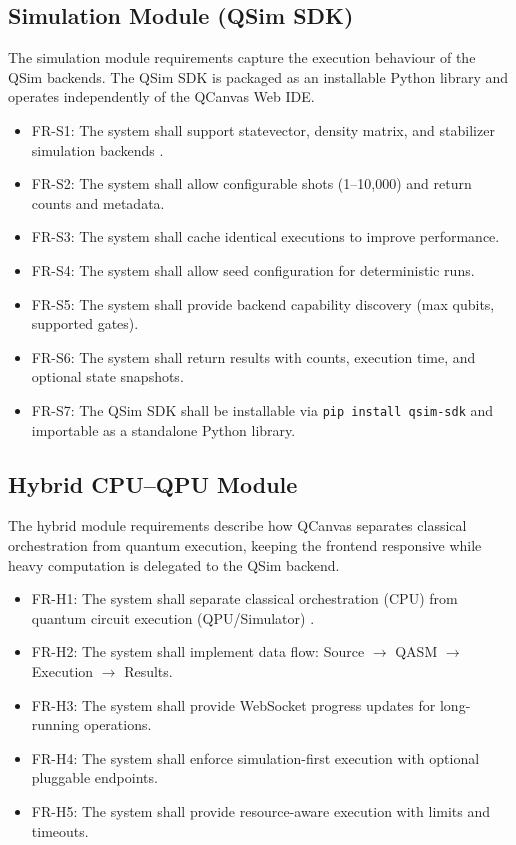 \subsection{Simulation Module (QSim SDK)}
The simulation module requirements capture the execution behaviour of the QSim backends. The QSim SDK is packaged as an installable Python library and operates independently of the QCanvas Web IDE.
\begin{itemize}
    \item FR-S1: The system shall support statevector, density matrix, and stabilizer simulation backends \cite{nielsen2010quantum}.
    \item FR-S2: The system shall allow configurable shots (1--10,000) and return counts and metadata.
    \item FR-S3: The system shall cache identical executions to improve performance.
    \item FR-S4: The system shall allow seed configuration for deterministic runs.
    \item FR-S5: The system shall provide backend capability discovery (max qubits, supported gates).
    \item FR-S6: The system shall return results with counts, execution time, and optional state snapshots.
    \item FR-S7: The QSim SDK shall be installable via \texttt{pip install qsim-sdk} and importable as a standalone Python library.
\end{itemize}

\subsection{Hybrid CPU--QPU Module}
The hybrid module requirements describe how QCanvas separates classical orchestration from quantum execution, keeping the frontend responsive while heavy computation is delegated to the QSim backend.
\begin{itemize}
    \item FR-H1: The system shall separate classical orchestration (CPU) from quantum circuit execution (QPU/Simulator) \cite{peruzzo2014variational}.
    \item FR-H2: The system shall implement data flow: Source $\rightarrow$ QASM $\rightarrow$ Execution $\rightarrow$ Results.
    \item FR-H3: The system shall provide WebSocket progress updates for long-running operations.
    \item FR-H4: The system shall enforce simulation-first execution with optional pluggable endpoints.
    \item FR-H5: The system shall provide resource-aware execution with limits and timeouts.
\end{itemize}

